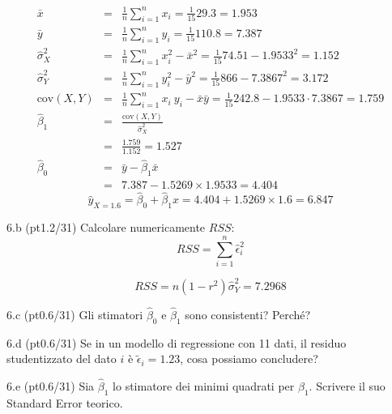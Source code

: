 \documentclass[
  10pt,
]{article}
\begin{document}
\begin{sol}
\begin{eqnarray*}
           \bar x &=&\frac 1 n\sum_{i=1}^n x_i = \frac {1}{ 15 }  29.3 =  1.953 \\
           \bar y &=&\frac 1 n\sum_{i=1}^n y_i = \frac {1}{ 15 }  110.8 =  7.387 \\
           \hat\sigma_X^2&=&\frac 1 n\sum_{i=1}^n x_i^2-\bar x^2=\frac {1}{ 15 }  74.51  - 1.9533 ^2= 1.152 \\
           \hat\sigma_Y^2&=&\frac 1 n\sum_{i=1}^n y_i^2-\bar y^2=\frac {1}{ 15 }  866  - 7.3867 ^2= 3.172 \\
           \text{cov}(X,Y)&=&\frac 1 n\sum_{i=1}^n x_i~y_i-\bar x\bar y=\frac {1}{ 15 }  242.8 - 1.9533 \cdot 7.3867 = 1.759 \\
           \hat\beta_1 &=& \frac{\text{cov}(X,Y)}{\hat\sigma_X^2} \\
                    &=& \frac{ 1.759 }{ 1.152 }  =  1.527 \\
           \hat\beta_0 &=& \bar y - \hat\beta_1 \bar x\\
                    &=&  7.387 - 1.5269 \times  1.9533 = 4.404 
         \end{eqnarray*}\[\hat y_{X= 1.6 }=\hat\beta_0+\hat\beta_1 x= 4.404 + 1.5269 \times 1.6 = 6.847 \]

\end{sol}

6.b (pt\hspace{.1em}1.2/31) Calcolare numericamente \(RSS\):
\[
RSS=\sum_{i=1}^n \hat\epsilon_i^2
\]

\begin{sol}
\[RSS=n(1-r^2)\hat\sigma_Y^2=7.2968\]

\end{sol}

6.c (pt\hspace{.1em}0.6/31) Gli stimatori \(\hat\beta_0\) e \(\hat\beta_1\) sono consistenti?
Perché?

6.d (pt\hspace{.1em}0.6/31) Se in un modello di regressione con 11 dati,
il residuo studentizzato del dato \(i\) è \(\tilde \epsilon_i=1.23\), cosa possiamo concludere?

6.e (pt\hspace{.1em}0.6/31) Sia \(\hat\beta_1\) lo stimatore dei minimi quadrati per \(\beta_1\).
Scrivere il suo Standard Error teorico.
\end{document}

